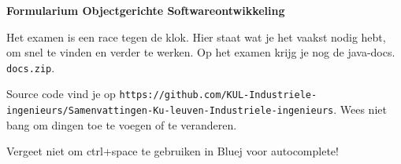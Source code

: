 \documentclass[12pt,a4paper]{extarticle}
\begin{document}
\begin{center}
    {\Large\bfseries Formularium Objectgerichte Softwareontwikkeling}\\[0.5mm]
    {\small Het examen is een race tegen de klok. Hier staat wat je het vaakst nodig
    hebt, om snel te vinden en verder te werken. Op het examen krijg je nog de java-docs.
    \texttt{docs.zip}.

    Source code vind je op \texttt{https://github.com/KUL-Industriele-ingenieurs/Samenvattingen-Ku-leuven-Industriele-ingenieurs}. Wees niet bang om
    dingen toe te voegen of te veranderen.}

    Vergeet niet om ctrl+space te gebruiken in Bluej voor autocomplete!
\end{center}
\vspace{1mm}
\end{document}
